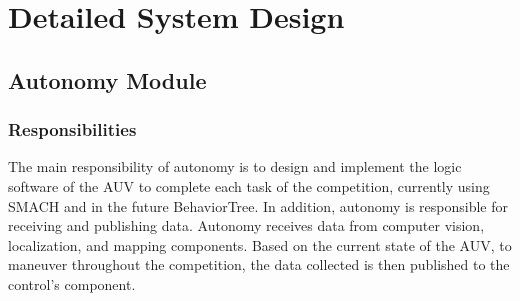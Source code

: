 \section{Detailed System Design}
\label{sec:detailed}

\subsection{Autonomy Module}
\label{sec:autonomy_design}

\subsubsection{Responsibilities}
\label{sec:responsibilities}

The main responsibility of autonomy is to design and implement the logic
software of the AUV to complete each task of the competition, currently using
SMACH and in the future BehaviorTree. In addition, autonomy is responsible for
receiving and publishing data. Autonomy receives data from computer vision,
localization, and mapping components. Based on the current state of the AUV, to
maneuver throughout the competition, the data collected is then published to
the control's component.
\par

